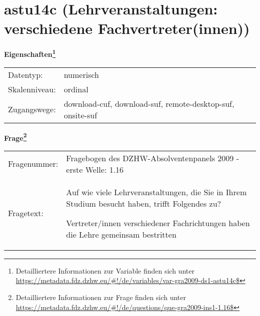
    \setcounter{footnote}{0}

    \vspace*{-1.8cm}
	\section{astu14c (Lehrveranstaltungen: verschiedene Fachvertreter(innen))}
	\label{section:astu14c}



    \vspace*{0.5cm}
    \noindent\textbf{Eigenschaften\footnote{Detailliertere Informationen zur Variable finden sich unter
		\url{https://metadata.fdz.dzhw.eu/\#!/de/variables/var-gra2009-ds1-astu14c$}}}\\
	\begin{tabularx}{\hsize}{@{}lX}
	Datentyp: & numerisch \\
	Skalenniveau: & ordinal \\
	Zugangswege: &
	  download-cuf, 
	  download-suf, 
	  remote-desktop-suf, 
	  onsite-suf
 \\
    \end{tabularx}



				\vspace*{0.5cm}
                \noindent\textbf{Frage\footnote{Detailliertere Informationen zur Frage finden sich unter
		              \url{https://metadata.fdz.dzhw.eu/\#!/de/questions/que-gra2009-ins1-1.16$}}}\\
				\begin{tabularx}{\hsize}{@{}lX}
					Fragenummer: &
					  Fragebogen des DZHW-Absolventenpanels 2009 - erste Welle:
					  1.16
 \\
					Fragetext: & Auf wie viele Lehrveranstaltungen, die Sie in Ihrem Studium besucht haben, trifft Folgendes zu?\par  Vertreter/innen verschiedener Fachrichtungen haben die Lehre gemeinsam bestritten \\
				\end{tabularx}





